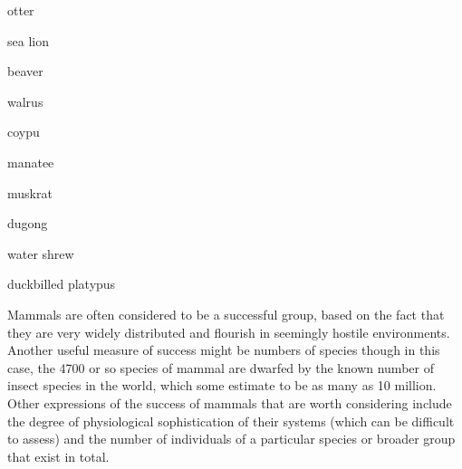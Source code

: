 \documentclass[letterpaper,10pt,english]{sphinxmanual}
\begin{document}
otter









sea lion





beaver









walrus





coypu









manatee





muskrat









dugong





water shrew













duck\sphinxhyphen{}billed platypus









Mammals are often considered to be a successful group, based on the fact that they are very widely distributed and flourish in seemingly hostile environments. Another useful measure of success might be numbers of species \textendash{} though in this case, the 4700 or so species of mammal are dwarfed by the known number of insect species in the world, which some estimate to be as many as 10 million. Other expressions of the success of mammals that are worth considering include the degree of physiological
sophistication of their systems (which can be difficult to assess) and the number of individuals of a particular species or broader group that exist in total.
\end{document}
